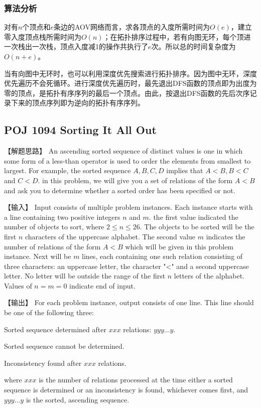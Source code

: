 \subsubsection{算法分析}
对有$n$个顶点和$e$条边的AOV网络而言，求各顶点的入度所需时间为$O(e)$，建立零入度顶点栈所需时间为$O(n)$；在拓扑排序过程中，若有向图无环，每个顶进一次栈出一次栈，顶点入度减1的操作共执行了$e$次。所以总的时间复杂度为$O(n+e)$。

当有向图中无环时，也可以利用深度优先搜索进行拓扑排序。因为图中无环，深度优先遍历不会死循环。进行深度优先遍历时，最先退出DFS函数的顶点即为出度为零的顶点，是拓扑有序序列的最后一个顶点。由此，按退出DFS函数的先后次序记录下来的顶点序列即为逆向的拓扑有序序列。


\subsection{POJ 1094 Sorting It All Out}
【解题思路】
An ascending sorted sequence of distinct values is one in which some form of a less-than operator is used to order the elements from smallest to largest. For example, the sorted sequence $A, B, C, D$ implies that $A < B, B < C$ and $C < D$. in this problem, we will give you a set of relations of the form $A < B$ and ask you to determine whether a sorted order has been specified or not.

【输入】
Input consists of multiple problem instances. Each instance starts with a line containing two positive integers $n$ and $m$. the first value indicated the number of objects to sort, where $2 \leq n \leq 26$. The objects to be sorted will be the first $n$ characters of the uppercase alphabet. The second value $m$ indicates the number of relations of the form $A < B$ which will be given in this problem instance. Next will be $m$ lines, each containing one such relation consisting of three characters: an uppercase letter, the character "<" and a second uppercase letter. No letter will be outside the range of the first $n$ letters of the alphabet. Values of $n = m = 0$ indicate end of input.

【输出】
For each problem instance, output consists of one line. This line should be one of the following three:

Sorted sequence determined after $xxx$ relations: $yyy...y$.

Sorted sequence cannot be determined.

Inconsistency found after $xxx$ relations.

where $xxx$ is the number of relations processed at the time either a sorted sequence is determined or an inconsistency is found, whichever comes first, and $yyy...y$ is the sorted, ascending sequence.

